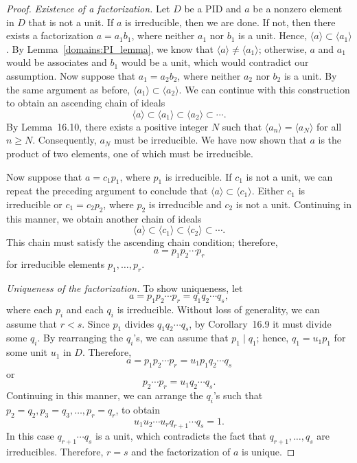\begin{proof}
{\em Existence of a factorization.}
Let $D$ be a PID and $a$ be a nonzero element in $D$ that is not a
unit. If $a$ is irreducible, then we are done. If not, then there
exists a factorization $a = a_1 b_1$, where neither $a_1$ nor $b_1$ is
a unit. Hence, $\langle a \rangle \subset \langle a_1 \rangle$. By
Lemma~\ref{domains:PI_lemma}, we know that $\langle a \rangle \neq \langle a_1 \rangle$;
otherwise, $a$ and $a_1$ would be associates and $b_1$ would be a unit,
which would contradict our assumption. Now suppose that $a_1 =  a_2
b_2$, where neither $a_2$ nor $b_2$ is a unit. By the same argument as
before, $\langle a_1 \rangle \subset \langle a_2 \rangle$.  We can
continue with this construction to obtain an ascending chain of ideals
\[
\langle a \rangle \subset \langle a_1 \rangle \subset \langle a_2
\rangle \subset \cdots.
\]
By Lemma~16.10, there exists a positive integer $N$ such that
$\langle a_n \rangle = \langle a_N \rangle$ for all $n \geq N$. 
Consequently, $a_N$ must be irreducible. We have now shown that $a$ is
the product of two elements, one of which must be irreducible.  


Now suppose that $a = c_1 p_1$, where $p_1$ is irreducible. If $c_1$
is not a unit, we can repeat the preceding argument to conclude that
$\langle a \rangle \subset \langle c_1 \rangle$. Either $c_1$ is
irreducible or $c_1 = c_2 p_2$, where $p_2$ is irreducible and $c_2$
is not a unit.  Continuing in this manner, we obtain another chain of
ideals
\[
\langle a \rangle \subset \langle c_1 \rangle \subset \langle c_2
\rangle \subset \cdots.	   
\]
This chain must satisfy the ascending chain condition; therefore, 
\[
a = p_1 p_2 \cdots p_r
\]
for irreducible elements $p_1, \ldots, p_r$.


{\em Uniqueness of the factorization.}
To show uniqueness, let
\[
a= p_1 p_2 \cdots p_r = q_1 q_2 \cdots q_s,
\]
where each $p_i$ and each $q_i$ is irreducible.  Without loss of
generality, we can assume that $r < s$. Since $p_1$ divides $q_1 q_2
\cdots q_s$, by Corollary~16.9 it must divide some $q_i$. By
rearranging the $q_i$'s, we can assume that $p_1 \mid q_1$; hence,
$q_1 = u_1 p_1$ for some unit $u_1$ in $D$. Therefore,
\[
a = p_1 p_2 \cdots p_r = u_1 p_1 q_2 \cdots q_s
\]
or 
\[
p_2 \cdots p_r = u_1 q_2 \cdots q_s.
\]
Continuing in this manner, we can arrange the $q_i$'s such that $p_2
= q_2, p_3 = q_3, \ldots, p_r = q_r$, to obtain
\[
u_1 u_2 \cdots u_r q_{r+1} \cdots q_s = 1.
\]
In this case $q_{r+1} \cdots q_s$ is a unit, which contradicts the
fact that $q_{r+1}, \ldots, q_s$ are irreducibles. Therefore, $r=s$
and the factorization of $a$ is unique.
\end{proof}

